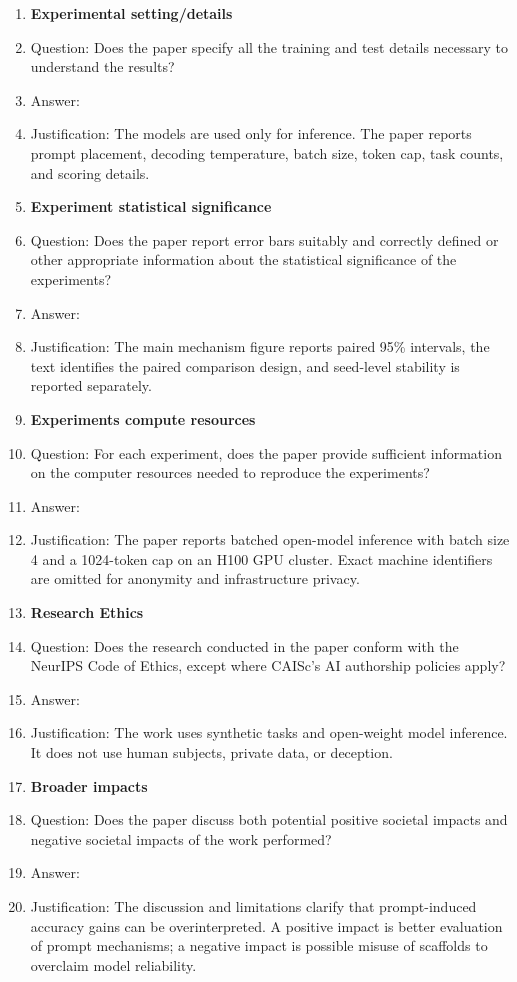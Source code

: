 \documentclass{article}
\begin{document}
\begin{enumerate}
    \item {\bf Experimental setting/details}
    \item[] Question: Does the paper specify all the training and test details necessary to understand the results?
    \item[] Answer: \answerYes{}
    \item[] Justification: The models are used only for inference. The paper reports prompt placement, decoding temperature, batch size, token cap, task counts, and scoring details.

    \item {\bf Experiment statistical significance}
    \item[] Question: Does the paper report error bars suitably and correctly defined or other appropriate information about the statistical significance of the experiments?
    \item[] Answer: \answerYes{}
    \item[] Justification: The main mechanism figure reports paired 95\% intervals, the text identifies the paired comparison design, and seed-level stability is reported separately.

    \item {\bf Experiments compute resources}
    \item[] Question: For each experiment, does the paper provide sufficient information on the computer resources needed to reproduce the experiments?
    \item[] Answer: \answerYes{}
    \item[] Justification: The paper reports batched open-model inference with batch size 4 and a 1024-token cap on an H100 GPU cluster. Exact machine identifiers are omitted for anonymity and infrastructure privacy.

    \item {\bf Research Ethics}
    \item[] Question: Does the research conducted in the paper conform with the NeurIPS Code of Ethics, except where CAISc's AI authorship policies apply?
    \item[] Answer: \answerYes{}
    \item[] Justification: The work uses synthetic tasks and open-weight model inference. It does not use human subjects, private data, or deception.

    \item {\bf Broader impacts}
    \item[] Question: Does the paper discuss both potential positive societal impacts and negative societal impacts of the work performed?
    \item[] Answer: \answerYes{}
    \item[] Justification: The discussion and limitations clarify that prompt-induced accuracy gains can be overinterpreted. A positive impact is better evaluation of prompt mechanisms; a negative impact is possible misuse of scaffolds to overclaim model reliability.
\end{enumerate}
\end{document}
